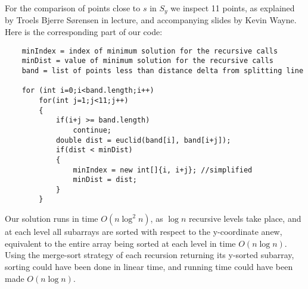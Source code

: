 \documentclass{article}
\begin{document}
  For the comparison of points close to $s$ in $S_y$ we inspect 11 points,
  as explained by Troels Bjerre Sørensen in lecture, and accompanying slides by Kevin Wayne.\\	
  Here is the corresponding part of our code:
  \begin{verbatim}
    minIndex = index of minimum solution for the recursive calls
    minDist = value of minimum solution for the recursive calls
    band = list of points less than distance delta from splitting line
    
    for (int i=0;i<band.length;i++)
        for(int j=1;j<11;j++)
        {
            if(i+j >= band.length)
                continue;
            double dist = euclid(band[i], band[i+j]);
            if(dist < minDist)
            {
                minIndex = new int[]{i, i+j}; //simplified
                minDist = dist;
            }
        }
  \end{verbatim}
	
  Our solution runs in time $O(n \log^2 n)$, as $\log n$ recursive levels take place, and at each level all subarrays are sorted with respect to the y-coordinate anew, equivalent to the entire array being sorted at each level in time $O(n \log n)$. Using the merge-sort strategy of each recursion returning its y-sorted subarray, sorting could have been done in linear time, and running time could have been made $O(n\log n)$.
\end{document}
